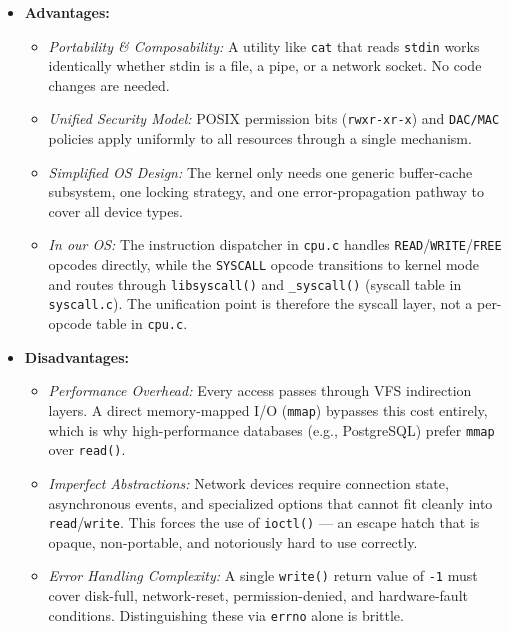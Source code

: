 \begin{itemize}
    \item \textbf{Advantages:}
    \begin{itemize}
        \item \textit{Portability \& Composability:} A utility like \texttt{cat} that reads \texttt{stdin} works identically whether stdin is a file, a pipe, or a network socket. No code changes are needed.
        \item \textit{Unified Security Model:} POSIX permission bits (\texttt{rwxr-xr-x}) and \texttt{DAC/MAC} policies apply uniformly to all resources through a single mechanism.
        \item \textit{Simplified OS Design:} The kernel only needs one generic buffer-cache subsystem, one locking strategy, and one error-propagation pathway to cover all device types.
        \item \textit{In our OS:} The instruction dispatcher in \texttt{cpu.c} handles \texttt{READ}/\texttt{WRITE}/\texttt{FREE} opcodes directly, while the \texttt{SYSCALL} opcode transitions to kernel mode and routes through \texttt{libsyscall()} and \texttt{\_syscall()} (syscall table in \texttt{syscall.c}). The unification point is therefore the syscall layer, not a per-opcode table in \texttt{cpu.c}.
    \end{itemize}
    \item \textbf{Disadvantages:}
    \begin{itemize}
        \item \textit{Performance Overhead:} Every access passes through VFS indirection layers. A direct memory-mapped I/O (\texttt{mmap}) bypasses this cost entirely, which is why high-performance databases (e.g., PostgreSQL) prefer \texttt{mmap} over \texttt{read()}.
        \item \textit{Imperfect Abstractions:} Network devices require connection state, asynchronous events, and specialized options that cannot fit cleanly into \texttt{read}/\texttt{write}. This forces the use of \texttt{ioctl()} --- an escape hatch that is opaque, non-portable, and notoriously hard to use correctly.
        \item \textit{Error Handling Complexity:} A single \texttt{write()} return value of \texttt{-1} must cover disk-full, network-reset, permission-denied, and hardware-fault conditions. Distinguishing these via \texttt{errno} alone is brittle.
    \end{itemize}
\end{itemize}


